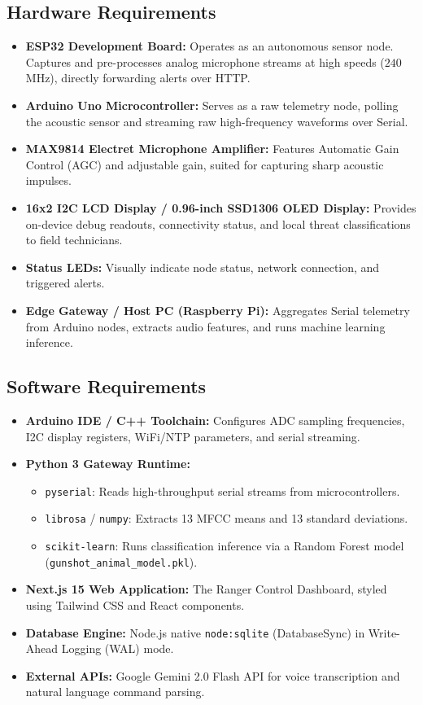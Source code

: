 \documentclass[11pt,a4paper]{article}
\begin{document}
\subsection{Hardware Requirements}
\begin{itemize}
    \item \textbf{ESP32 Development Board:} Operates as an autonomous sensor node. Captures and pre-processes analog microphone streams at high speeds ($240$\,MHz), directly forwarding alerts over HTTP.
    \item \textbf{Arduino Uno Microcontroller:} Serves as a raw telemetry node, polling the acoustic sensor and streaming raw high-frequency waveforms over Serial.
    \item \textbf{MAX9814 Electret Microphone Amplifier:} Features Automatic Gain Control (AGC) and adjustable gain, suited for capturing sharp acoustic impulses.
    \item \textbf{16x2 I2C LCD Display / 0.96-inch SSD1306 OLED Display:} Provides on-device debug readouts, connectivity status, and local threat classifications to field technicians.
    \item \textbf{Status LEDs:} Visually indicate node status, network connection, and triggered alerts.
    \item \textbf{Edge Gateway / Host PC (Raspberry Pi):} Aggregates Serial telemetry from Arduino nodes, extracts audio features, and runs machine learning inference.
\end{itemize}

\subsection{Software Requirements}
\begin{itemize}
    \item \textbf{Arduino IDE / C++ Toolchain:} Configures ADC sampling frequencies, I2C display registers, WiFi/NTP parameters, and serial streaming.
    \item \textbf{Python 3 Gateway Runtime:}
    \begin{itemize}
        \item \texttt{pyserial}: Reads high-throughput serial streams from microcontrollers.
        \item \texttt{librosa} / \texttt{numpy}: Extracts 13 MFCC means and 13 standard deviations.
        \item \texttt{scikit-learn}: Runs classification inference via a Random Forest model (\texttt{gunshot\_animal\_model.pkl}).
    \end{itemize}
    \item \textbf{Next.js 15 Web Application:} The Ranger Control Dashboard, styled using Tailwind CSS and React components.
    \item \textbf{Database Engine:} Node.js native \texttt{node:sqlite} (DatabaseSync) in Write-Ahead Logging (WAL) mode.
    \item \textbf{External APIs:} Google Gemini 2.0 Flash API for voice transcription and natural language command parsing.
\end{itemize}
\end{document}
